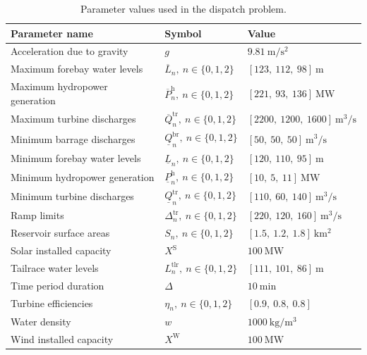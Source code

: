 \documentclass[a4paper,fleqn]{cas-sc}
\begin{document}
\begin{table}
\centering
\renewcommand{\arraystretch}{1}
\begin{tabular}{lll}
\hline
\textbf{Parameter name} & \textbf{Symbol} & \textbf{Value} \\
\hline

Acceleration due to gravity 
& $g$ 
& $9.81\ \mathrm{m/s^{2}}$ \\

Maximum forebay water levels 
& $\overline{L}_{n},\ n \in \{0,1,2\}$ 
& $[123,\ 112,\ 98]\ \mathrm{m}$ \\

Maximum hydropower generation 
& $\overline{P}^{\mathrm{h}}_{n},\ n \in \{0,1,2\}$ 
& $[221,\ 93,\ 136]\ \mathrm{MW}$ \\

Maximum turbine discharges 
& $\overline{Q}^{\mathrm{tr}}_{n},\ n \in \{0,1,2\}$ 
& $[2200,\ 1200,\ 1600]\ \mathrm{m^3/s}$ \\

Minimum barrage discharges 
& $\underline{Q}^{\mathrm{br}}_{n},\ n \in \{0,1,2\}$ 
& $[50,\ 50,\ 50]\ \mathrm{m^3/s}$ \\

Minimum forebay water levels 
& $\underline{L}_{n},\ n \in \{0,1,2\}$ 
& $[120,\ 110,\ 95]\ \mathrm{m}$ \\

Minimum hydropower generation 
& $\underline{P}^{\mathrm{h}}_{n},\ n \in \{0,1,2\}$ 
& $[10,\ 5,\ 11]\ \mathrm{MW}$ \\

Minimum turbine discharges 
& $\underline{Q}^{\mathrm{tr}}_{n},\ n \in \{0,1,2\}$ 
& $[110,\ 60,\ 140]\ \mathrm{m^3/s}$ \\

Ramp limits 
& $\Delta^{\mathrm{tr}}_{n},\ n \in \{0,1,2\}$ 
& $[220,\ 120,\ 160]\ \mathrm{m^3/s}$ \\

Reservoir surface areas 
& $S_{n},\ n \in \{0,1,2\}$ 
& $[1.5,\ 1.2,\ 1.8]\ \mathrm{km^2}$ \\

Solar installed capacity 
& $X^{\mathrm{S}}$ 
& $100\ \mathrm{MW}$ \\

Tailrace water levels 
& $L^{\mathrm{tlr}}_{n},\ n \in \{0,1,2\}$ 
& $[111,\ 101,\ 86]\ \mathrm{m}$ \\

Time period duration 
& $\Delta$ 
& $10\ \mathrm{min}$ \\

Turbine efficiencies 
& $\eta_n,\ n \in \{0,1,2\}$ 
& $[0.9,\ 0.8,\ 0.8]$ \\

Water density 
& $w$ 
& $1000\ \mathrm{kg/m^{3}}$ \\

Wind installed capacity 
& $X^{\mathrm{W}}$ 
& $100\ \mathrm{MW}$ \\
\hline
\end{tabular}
\caption{Parameter values used in the dispatch problem.}
\label{tab:parameters}
\end{table}
\end{document}
